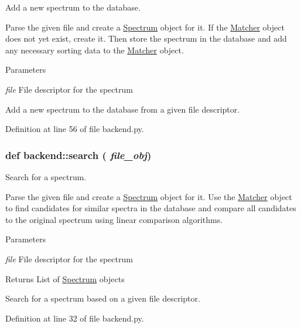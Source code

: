 Add a new spectrum to the database. 

Parse the given file and create a \hyperlink{classbackend_1_1_spectrum}{Spectrum} object for it. If the \hyperlink{classbackend_1_1_matcher}{Matcher} object does not yet exist, create it. Then store the spectrum in the database and add any necessary sorting data to the \hyperlink{classbackend_1_1_matcher}{Matcher} object.


\begin{DoxyParams}{Parameters}
\item[{\em file}]File descriptor for the spectrum\begin{DoxyVerb}Add a new spectrum to the database from a given file descriptor.\end{DoxyVerb}
 \end{DoxyParams}


Definition at line 56 of file backend.py.

\hypertarget{namespacebackend_af7a9bbf936ca6c76342679bb4a3509cd}{
\subsubsection[{search}]{\setlength{\rightskip}{0pt plus 5cm}def backend::search ( {\em file\_\-obj})}}
\label{namespacebackend_af7a9bbf936ca6c76342679bb4a3509cd}


Search for a spectrum. 

Parse the given file and create a \hyperlink{classbackend_1_1_spectrum}{Spectrum} object for it. Use the \hyperlink{classbackend_1_1_matcher}{Matcher} object to find candidates for similar spectra in the database and compare all candidates to the original spectrum using linear comparison algorithms.


\begin{DoxyParams}{Parameters}
\item[{\em file}]File descriptor for the spectrum \end{DoxyParams}
\begin{DoxyReturn}{Returns}
List of \hyperlink{classbackend_1_1_spectrum}{Spectrum} objects\begin{DoxyVerb}Search for a spectrum based on a given file descriptor.\end{DoxyVerb}
 
\end{DoxyReturn}


Definition at line 32 of file backend.py.

